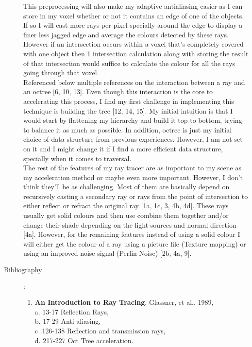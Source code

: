 \documentclass {article}
\begin{document}
\begin{description}
    This preprocessing will also make my adaptive antialiasing easier as I can store in my voxel whether or not it contains an edge of one of the objects. If so I will cast more rays per pixel specially around the edge to display a finer less jagged edge and average the colours detected by these rays. However if an intersection occurs within a voxel that's completely covered with one object then 1 intersection calculation along with storing the result of that intersection would suffice to calculate the colour for all the rays going through that voxel.\\
    Referenced below multiple references on the interaction between a ray and an octree [6, 10, 13]. Even though this interaction is the core to accelerating this process, I find my first challenge in implementing this technique is building the tree [12, 14, 15]. My initial intuition is that I would start by flattening my hierarchy and build it top to bottom, trying to balance it as much as possible. In addition, octree is just my initial choice of data structure from previous experiences. However, I am not set on it and I might change it if I find a more efficient data structure, specially when it comes to traversal.\\
  
    The rest of the features of my ray tracer are as important to my scene as my acceleration method or maybe even more important. However, I don't think they'll be as challenging. Most of them are basically depend on recursively casting a secondary ray or rays from the point of intersection to either reflect or refract the original ray [1a, 1c, 3, 4b, 4d]. These rays usually get solid colours and then use combine them together and/or change their shade depending on the light sources and normal direction [4a]. However, for the remaining features instead of using a solid colour I will either get the colour of a ray using a picture file (Texture mapping) or using an improved noise signal (Perlin Noise) [2b, 4a, 9].
    
\newpage

\item[Bibliography]:\\
     
     \begin{enumerate}
     	\item {\bf An Introduction to Ray Tracing}, Glassner, et al., 1989,\\
	a. 13-17 Reflection Rays,\\
	b. 17-29 Anti-aliasing,\\
	c .126-138 Reflection and transmission rays,\\
	d. 217-227 Oct Tree acceleration.
	

\end{enumerate}
\end{description}
\end{document}
